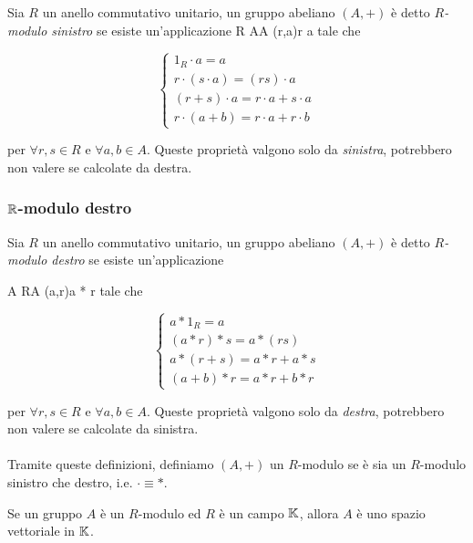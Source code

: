 Sia $ R $ un anello commutativo unitario, un gruppo abeliano $ (A,+) $ è detto $ R $\textit{-modulo sinistro} se esiste un'applicazione
%
\map{\cdot}
	{R \times A}{A}
	{(r,a)}{r \cdot a}
tale che

\begin{equation}
	\begin{cases}
		1_{R} \cdot a = a\\
		r \cdot (s \cdot a) = (r s) \cdot a\\
		(r+s) \cdot a = r \cdot a + s \cdot a\\
		r \cdot (a+b) = r \cdot a + r \cdot b
	\end{cases}
\end{equation}

per $ \forall r, s \in R $ e $ \forall a, b \in A $. Queste proprietà valgono solo da \textit{sinistra}, potrebbero non valere se calcolate da destra.

\subsubsection{$ \mathbb{R} $-modulo destro}

Sia $ R $ un anello commutativo unitario, un gruppo abeliano $ (A,+) $ è detto $ R $\textit{-modulo destro} se esiste un'applicazione

%
\map{*}
	{A \times R}{A}
	{(a,r)}{a * r}
tale che

\begin{equation}
	\begin{cases}
		a * 1_{R} = a\\
		(a*r)*s = a*(r s)\\
		a*(r+s) = a*r + a*s\\
		(a+b)*r = a*r + b*r
	\end{cases}
\end{equation}

per $ \forall r,s \in R $ e $ \forall a,b \in A $. Queste proprietà valgono solo da \textit{destra}, potrebbero non valere se calcolate da sinistra.\\\\
%
Tramite queste definizioni, definiamo $ (A,+) $ un $ R $-modulo se è sia un $ R $-modulo sinistro che destro, i.e. $ \cdot \equiv * $.

\begin{remark}
	Se un gruppo $ A $ è un $ R $-modulo ed $ R $ è un campo $ \mathbb{K} $, allora $ A $ è uno spazio vettoriale in $ \mathbb{K} $.
\end{remark}


